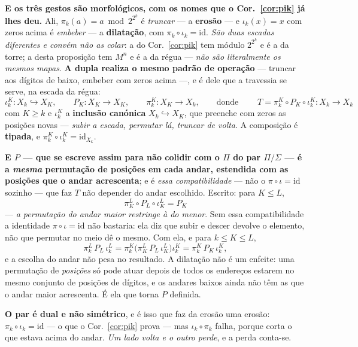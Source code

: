 \documentclass[11pt,a4paper]{article}
\begin{document}
\medskip\noindent\textbf{E os três gestos são morfológicos, com os nomes que o
Cor.~\ref{cor:pik} já lhes deu.} Ali, $\pi_k(a)=a\bmod 2^{2^{k}}$ é \emph{truncar} ---
a \textbf{erosão} --- e $\iota_k(x)=x$ com zeros acima é \emph{embeber} --- a
\textbf{dilatação}, com $\pi_k\circ\iota_k=\mathrm{id}$. \emph{São duas escadas
diferentes e convém não as colar}: a do Cor.~\ref{cor:pik} tem módulo $2^{2^{k}}$ e é a
da torre; a desta proposição tem $M^{n}$ e é a da régua --- \emph{não são literalmente
os mesmos mapas}. \textbf{A dupla realiza o mesmo padrão de operação} --- truncar aos
dígitos de baixo, embeber com zeros acima ---, e é dele que a travessia se serve, na
escada da régua:
\[
 \iota_k^{K}\colon X_k\hookrightarrow X_K,\qquad
 P_K\colon X_K\to X_K,\qquad
 \pi_k^{K}\colon X_K\to X_k,
 \qquad\text{donde}\qquad
 \boxed{\;T=\pi_k^{K}\circ P_K\circ\iota_k^{K}\colon X_k\to X_k\;}
\]
com $K\ge k$ e $\iota_k^{K}$ a \textbf{inclusão canónica} $X_k\hookrightarrow X_K$,
que preenche com zeros as posições novas --- \emph{subir a escada, permutar lá, truncar
de volta}. A
composição é \textbf{tipada}, e $\pi_k^{K}\circ\iota_k^{K}=\mathrm{id}_{X_k}$.

\medskip\noindent\textbf{E $P$ --- que se escreve assim para não colidir com o $\Pi$ do
par $\Pi/\Sigma$ --- é a \emph{mesma} permutação de posições em cada andar, estendida com
as posições que o andar acrescenta}; e é \emph{essa compatibilidade} --- não o
$\pi\circ\iota=\mathrm{id}$ sozinho --- que faz $T$ não depender do andar escolhido.
Escrito:
para $K\le L$,
\[
 \boxed{\;\pi_K^{L}\circ P_L\circ\iota_K^{L}=P_K\;}
\]
--- \emph{a permutação do andar maior restringe à do menor}. Sem essa compatibilidade a
identidade $\pi\circ\iota=\mathrm{id}$ não bastaria: ela diz que subir e descer devolve o
elemento, não que permutar no meio dê o mesmo. Com ela, e para $k\le K\le L$,
\[
 \pi_k^{L}\,P_L\,\iota_k^{L}
 =\pi_k^{K}\bigl(\pi_K^{L}\,P_L\,\iota_K^{L}\bigr)\iota_k^{K}
 =\pi_k^{K}\,P_K\,\iota_k^{K},
\]
e a escolha do andar não pesa no resultado. A dilatação não é um
enfeite: uma permutação de \emph{posições} só pode atuar depois de todos os endereços
estarem no mesmo conjunto de posições de dígitos, e os andares baixos ainda não têm as
que o andar maior acrescenta. É ela que torna $P$ definida.

\medskip\noindent\textbf{O par é dual e não simétrico}, e é isso que faz da erosão uma
erosão: $\pi_k\circ\iota_k=\mathrm{id}$ --- o que o Cor.~\ref{cor:pik} prova --- mas
$\iota_k\circ\pi_k$ falha, porque corta o que estava acima do andar. \emph{Um lado
volta e o outro perde}, e a perda conta-se.
\end{document}
